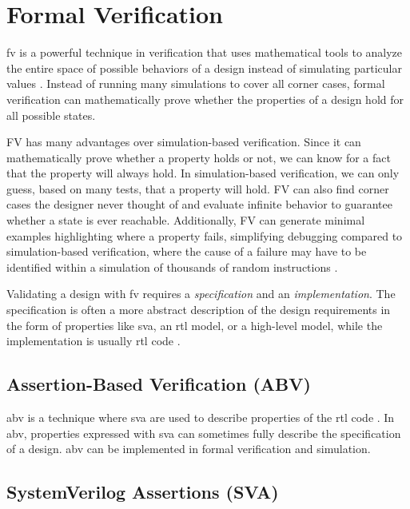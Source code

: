 \section{Formal Verification}
\label{sec:bg_formal}

\acrfull{fv} is a powerful technique in verification that uses mathematical tools to analyze the entire space of possible behaviors of a design instead of simulating particular values \cite{seligmanFormalVerificationEssential2015}. Instead of running many simulations to cover all corner cases, formal verification can mathematically prove whether the properties of a design hold for all possible states.

FV has many advantages over simulation-based verification. Since it can mathematically prove whether a property holds or not, we can know for a fact that the property will always hold. In simulation-based verification, we can only guess, based on many tests, that a property will hold. FV can also find corner cases the designer never thought of and evaluate infinite behavior to guarantee whether a state is ever reachable.
Additionally, FV can generate minimal examples highlighting where a property fails, simplifying debugging compared to simulation-based verification, where the cause of a failure may have to be identified within a simulation of thousands of random instructions \cite{seligmanFormalVerificationEssential2015}.

Validating a design with \acrshort{fv} requires a \textit{specification} and an \textit{implementation}. The specification is often a more abstract description of the design requirements in the form of properties like \acrfull{sva}, an \acrshort{rtl} model, or a high-level model, while the implementation is usually \acrshort{rtl} code \cite{seligmanFormalVerificationEssential2015}. 


\subsection{Assertion-Based Verification (ABV)}

\acrfull{abv} is a technique where \acrfull{sva} are used to describe properties of the \acrshort{rtl} code \cite{seligmanFormalVerificationEssential2015}. In \acrshort{abv}, properties expressed with \acrshort{sva} can sometimes fully describe the specification of a design. \acrshort{abv} can be implemented in formal verification and simulation.

\subsection{SystemVerilog Assertions (SVA)}

